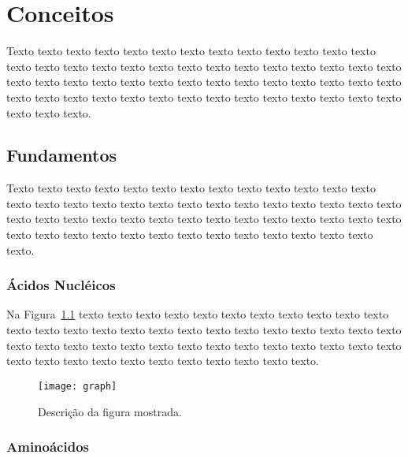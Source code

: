 \chapter{Conceitos}
\label{cap:conceitos}

Texto texto texto texto texto texto texto texto texto texto texto texto texto
texto texto texto texto texto texto texto texto texto texto texto texto texto
texto texto texto texto texto texto texto texto texto texto texto texto texto
texto texto texto texto texto texto texto texto texto texto texto texto texto
texto texto texto texto texto texto.

\section{Fundamentos}
\label{sec:fundamentos}

Texto texto texto texto texto texto texto texto texto texto texto texto texto
texto texto texto texto texto texto texto texto texto texto texto texto texto
texto texto texto texto texto texto texto texto texto texto texto texto texto
texto texto texto texto texto texto texto texto texto texto texto texto texto
texto texto texto.

\subsection{Ácidos Nucléicos}
\label{sec:acidos_nucleicos}

Na Figura~\ref{fig:humanbeta} texto texto texto texto texto texto texto texto
texto texto texto texto texto texto texto texto texto texto texto texto texto
texto texto texto texto texto texto texto texto texto texto texto texto texto
texto texto texto texto texto texto texto texto texto texto texto texto texto
texto texto texto.

\begin{figure}[!h]
  \centering
  \texttt{[image: graph]} 
  \caption{Descrição da figura mostrada.}
  \label{fig:humanbeta} 
\end{figure}

\subsection{Aminoácidos}
\label{sec:amino_acidos}

